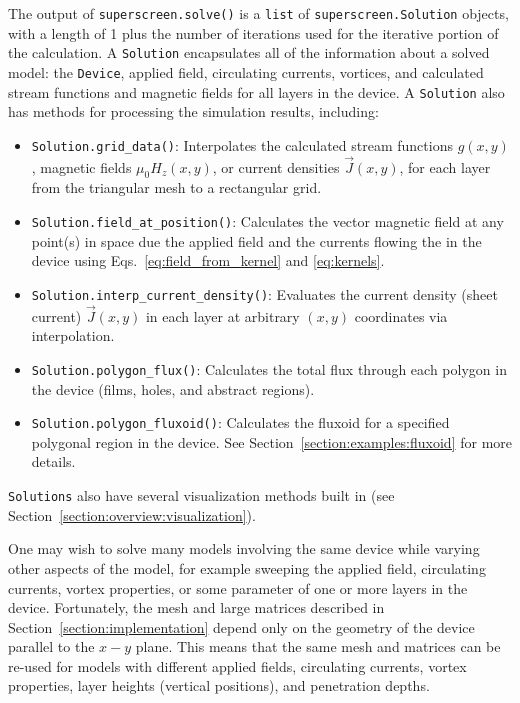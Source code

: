 \documentclass[final,3p,times]{elsarticle}
\newcommand{\inline}[1]{\texttt{#1}\xspace}
\begin{document}
The output of \inline{superscreen.solve()} is a \inline{list} of \inline{superscreen.Solution} objects, with a length of 1 plus the number of iterations used for the iterative portion of the calculation. A \inline{Solution} encapsulates all of the information about a solved model: the \inline{Device}, applied field, circulating currents, vortices, and calculated stream functions and magnetic fields for all layers in the device. A \inline{Solution} also has methods for processing the simulation results, including:
\begin{itemize}
    \item{
    \inline{Solution.grid_data()}: Interpolates the calculated stream functions $g(x, y)$, magnetic fields $\mu_0H_z(x, y)$, or current densities $\vec{J}(x, y)$, for each layer from the triangular mesh to a rectangular grid.
    }
    \item{
    \inline{Solution.field_at_position()}: Calculates the vector magnetic field at any point(s) in space due the applied field and the currents flowing the in the device using Eqs.~\ref{eq:field_from_kernel} and \ref{eq:kernels}.
    }
    \item{
    \inline{Solution.interp_current_density()}: Evaluates the current density (sheet current) $\vec{J}(x, y)$ in each layer at arbitrary $(x, y)$ coordinates via interpolation.
    }
    \item{
    \inline{Solution.polygon_flux()}: Calculates the total flux through each polygon in the device (films, holes, and abstract regions).
    }
    \item{
    \inline{Solution.polygon_fluxoid()}: Calculates the fluxoid for a specified polygonal region in the device. See Section~\ref{section:examples:fluxoid} for more details.
    }
\end{itemize}
\inline{Solutions} also have several visualization methods built in (see Section~\ref{section:overview:visualization}).

One may wish to solve many models involving the same device while varying other aspects of the model, for example sweeping the applied field, circulating currents, vortex properties, or some parameter of one or more layers in the device. Fortunately, the mesh and large matrices described in Section~\ref{section:implementation} depend only on the geometry of the device parallel to the $x-y$ plane. This means that the same mesh and matrices can be re-used for models with different applied fields, circulating currents, vortex properties, layer heights (vertical positions), and penetration depths.
\end{document}
